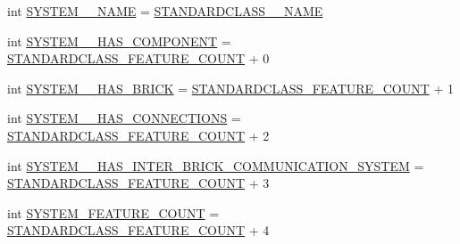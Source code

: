 \begin{DoxyCompactItemize}
\item 
int \hyperlink{interfaceshootingmachineemfmodel_1_1_shootingmachineemfmodel_package_aa25cfcfd60ceaea08b55a59cee83a5ca}{S\-Y\-S\-T\-E\-M\-\_\-\-\_\-\-N\-A\-M\-E} = \hyperlink{interfaceshootingmachineemfmodel_1_1_shootingmachineemfmodel_package_a06475d7d54d52ee19b2aaf4d5d73c738}{S\-T\-A\-N\-D\-A\-R\-D\-C\-L\-A\-S\-S\-\_\-\-\_\-\-N\-A\-M\-E}
\item 
int \hyperlink{interfaceshootingmachineemfmodel_1_1_shootingmachineemfmodel_package_a06b9c8fcde2110ea0af01f4164c5049f}{S\-Y\-S\-T\-E\-M\-\_\-\-\_\-\-H\-A\-S\-\_\-\-C\-O\-M\-P\-O\-N\-E\-N\-T} = \hyperlink{interfaceshootingmachineemfmodel_1_1_shootingmachineemfmodel_package_a14037f66989b3107e402142df96ee9aa}{S\-T\-A\-N\-D\-A\-R\-D\-C\-L\-A\-S\-S\-\_\-\-F\-E\-A\-T\-U\-R\-E\-\_\-\-C\-O\-U\-N\-T} + 0
\item 
int \hyperlink{interfaceshootingmachineemfmodel_1_1_shootingmachineemfmodel_package_adf7f88eb19fda1f4366b83c260d0bc0c}{S\-Y\-S\-T\-E\-M\-\_\-\-\_\-\-H\-A\-S\-\_\-\-B\-R\-I\-C\-K} = \hyperlink{interfaceshootingmachineemfmodel_1_1_shootingmachineemfmodel_package_a14037f66989b3107e402142df96ee9aa}{S\-T\-A\-N\-D\-A\-R\-D\-C\-L\-A\-S\-S\-\_\-\-F\-E\-A\-T\-U\-R\-E\-\_\-\-C\-O\-U\-N\-T} + 1
\item 
int \hyperlink{interfaceshootingmachineemfmodel_1_1_shootingmachineemfmodel_package_abdf9b98006657cc94bd60a69a57ac76d}{S\-Y\-S\-T\-E\-M\-\_\-\-\_\-\-H\-A\-S\-\_\-\-C\-O\-N\-N\-E\-C\-T\-I\-O\-N\-S} = \hyperlink{interfaceshootingmachineemfmodel_1_1_shootingmachineemfmodel_package_a14037f66989b3107e402142df96ee9aa}{S\-T\-A\-N\-D\-A\-R\-D\-C\-L\-A\-S\-S\-\_\-\-F\-E\-A\-T\-U\-R\-E\-\_\-\-C\-O\-U\-N\-T} + 2
\item 
int \hyperlink{interfaceshootingmachineemfmodel_1_1_shootingmachineemfmodel_package_a4fd2f2b659b1179017dd5d1ad8a7ce5b}{S\-Y\-S\-T\-E\-M\-\_\-\-\_\-\-H\-A\-S\-\_\-\-I\-N\-T\-E\-R\-\_\-\-B\-R\-I\-C\-K\-\_\-\-C\-O\-M\-M\-U\-N\-I\-C\-A\-T\-I\-O\-N\-\_\-\-S\-Y\-S\-T\-E\-M} = \hyperlink{interfaceshootingmachineemfmodel_1_1_shootingmachineemfmodel_package_a14037f66989b3107e402142df96ee9aa}{S\-T\-A\-N\-D\-A\-R\-D\-C\-L\-A\-S\-S\-\_\-\-F\-E\-A\-T\-U\-R\-E\-\_\-\-C\-O\-U\-N\-T} + 3
\item 
int \hyperlink{interfaceshootingmachineemfmodel_1_1_shootingmachineemfmodel_package_ad4a56d0fa7fcef2ee12468cd8a826a2b}{S\-Y\-S\-T\-E\-M\-\_\-\-F\-E\-A\-T\-U\-R\-E\-\_\-\-C\-O\-U\-N\-T} = \hyperlink{interfaceshootingmachineemfmodel_1_1_shootingmachineemfmodel_package_a14037f66989b3107e402142df96ee9aa}{S\-T\-A\-N\-D\-A\-R\-D\-C\-L\-A\-S\-S\-\_\-\-F\-E\-A\-T\-U\-R\-E\-\_\-\-C\-O\-U\-N\-T} + 4

\end{DoxyCompactItemize}
